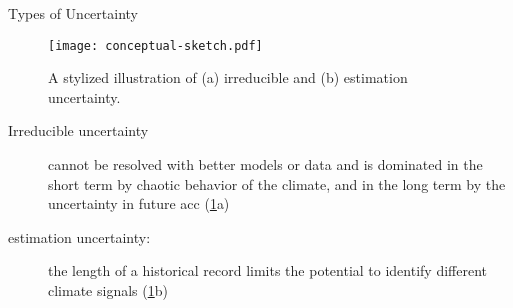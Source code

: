 \begin{block}{Types of Uncertainty}
    \begin{figure}
        \centering
        \caption{
            A stylized illustration of (a) irreducible and (b) estimation uncertainty.
        }\label{fig:conceptual-sketch}
        \texttt{[image: conceptual-sketch.pdf]}
    \end{figure}
    \begin{description}
        \item[Irreducible uncertainty] cannot be resolved with better models or data and is dominated in the short term by chaotic behavior of the climate, and in the long term by the uncertainty in future \acrlong{acc} (\cref{fig:conceptual-sketch}a) 
        \item[estimation uncertainty:] the length of a historical record limits the potential to identify different climate signals (\cref{fig:conceptual-sketch}b)
    \end{description}
\end{block}
